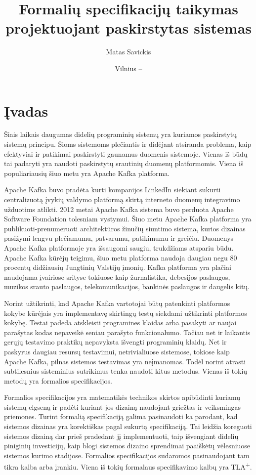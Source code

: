 \documentclass{VUMIFPSmagistrinis}
\title{Formalių specifikacijų taikymas projektuojant paskirstytas sistemas}
\author{Matas Savickis}
\date{Vilnius – \the\year}
\begin{document}
\maketitle

\tableofcontents

	\section{Įvadas}

		Šiais laikais daugumas didelių programinių sistemų yra kuriamos paskirstytų sistemų principu\cite{mcr}.
		Šioms sistemoms plečiantis ir didėjant atsiranda problema, kaip efektyviai ir patikimai paskirstyti gaunamus duomenis sistemoje.
		Vienas iš būdų tai padaryti yra naudoti paskirstytų srautinių duomenų platformomis.
		Viena iš populiariausių šiuo metu yra Apache Kafka platforma.


 		Apache Kafka buvo pradėta kurti kompanijos LinkedIn siekiant sukurti centralizuotą įvykių valdymo platformą skirtą interneto duomenų integravimo užduotims atlikti.
		2012 metai Apache Kafka sistema buvo perduota Apache Software Foundation tolesniam vystymui.
		Šiuo metu Apache Kafka platforma yra publikuoti-prenumeruoti architektūros žinučių siuntimo sistema, kurios dizainas pasižymi lengvu plečiamumu, patvarumu, patikimumu ir greičiu.
		Duomenys Apache Kafka platformoje yra išsaugomi saugiu, trukdžiams atspariu būdu.
		Apache Kafka kūrėjų teigimu, šiuo metu platforma naudoja daugiau negu 80 procentų didžiausių Jungtinių Valstijų įmonių.
		Kafka platforma yra plačiai naudojama įvairiose srityse tokiuose kaip žurnalistika, debesijos paslaugos, muzikos srauto paslaugos, telekomunikacijos, bankinės paslaugos ir daugelis kitų.


		Norint užtikrinti, kad Apache Kafka vartotojai būtų patenkinti platformos kokybe kūrėjais yra implementavę skirtingų testų siekdami užtikrinti platformos kokybę.
		Testai padeda atskleisti programines klaidas arba pasakyti ar naujai parašytas kodas nepaveikė seniau parašyto funkcionalumo.
		Tačiau net ir laikantis gerųjų testavimo praktikų nepavyksta išvengti programinių klaidų.
		Net ir paskyrus daugiau resursų testavimui, netrivialiuose sistemose, tokiose kaip Apache Kafka, pilnas sistemos testavimas yra neįmanomas.
		Todėl norint atrasti subtilesnius sisteminius sutrikimus tenka naudoti kitus metodus.
		Vienas iš tokių metodų yra formalios specifikacijos.


		Formalios specifikacijos yra matematikės technikos skirtos apibūdinti kuriamų sistemų elgseną ir padėti kuriant jos dizainą naudojant griežtas ir veiksmingas priemones.
		Turint formalią specifikaciją galima pasinaudoti ka parodant, kad sistemos dizainas yra korektiškas pagal sukurtą specifikaciją.
		Tai leidžia koreguoti sistemos dizainą dar prieš pradedant jį implementuoti, taip išvengiant didelių piniginių investicijų, kaip blogi sistemos dizaino sprendimai paaiškėtų vėlesniuose sistemos kūrimo stadijose.
		Formalios specifikacijos sudaromos pasinaudojant tam tikra kalba arba įrankiu.
		Viena iš tokių formalaus specifikavimo kalbų yra TLA\textsuperscript{+}.
		
\end{document}
